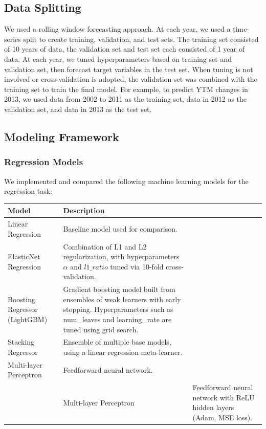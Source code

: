 \documentclass[12pt]{article}
\begin{document}
\subsection{Data Splitting}
We used a rolling window forecasting approach. At each year, we used a time-series split to create training, validation, and test sets. The training set consisted of 10 years of data, the validation set and test set each consisted of 1 year of data. At each year, we tuned hyperparameters based on training set and validation set, then forecast target variables in the test set.
When tuning is not involved or cross-validation is adopted, the validation set was combined with the training set to train the final model. For example, to predict YTM changes in 2013, we used data from 2002 to 2011 as the training set, data in 2012 as the validation set, and data in 2013 as the test set. 

\subsection{Modeling Framework}
\subsubsection{Regression Models}
We implemented and compared the following machine learning models for the regression task:
\begin{singlespace}
\begin{table}[H]
\centering
\begin{tabular}{p{4cm} p{9.5cm}}
\toprule
\textbf{Model} & \textbf{Description} \\
\midrule
Linear Regression 
& Baseline model used for comparison. \\
ElasticNet Regression
& Combination of L1 and L2 regularization, with hyperparameters 
$\alpha$ and $l1\_ratio$ tuned via 10-fold cross-validation. \\
Boosting Regressor (LightGBM) 
& Gradient boosting model built from ensembles of weak learners with early stopping. Hyperparameters such as num\_leaves and learning\_rate are tuned using grid search. \\
Stacking Regressor 
& Ensemble of multiple base models, using a linear regression meta-learner. \\
Multi-layer Perceptron 
& Feedforward neural network. \\
& Multi-layer Perceptron & Feedforward neural network with ReLU hidden layers (Adam, MSE loss). \\
\bottomrule
\end{tabular}
\end{table}
\end{singlespace}
\end{document}
